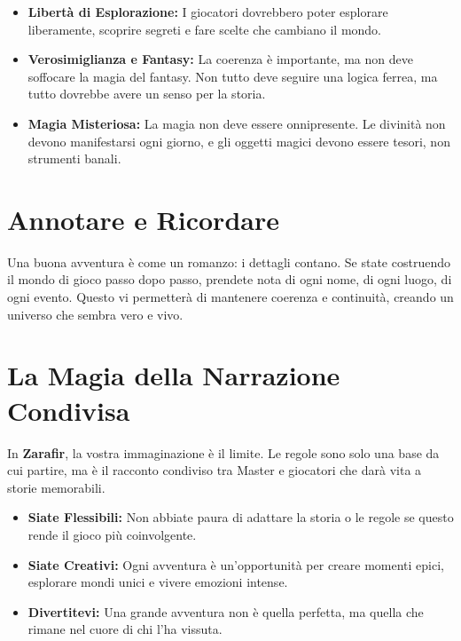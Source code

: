 \documentclass[../manuale_main.tex]{subfiles}
\begin{document}
\begin{itemize}
    \item \textbf{Libertà di Esplorazione:} I giocatori dovrebbero poter esplorare liberamente, scoprire segreti e fare scelte che cambiano il mondo.
    
    \item \textbf{Verosimiglianza e Fantasy:} La coerenza è importante, ma non deve soffocare la magia del fantasy. Non tutto deve seguire una logica ferrea, ma tutto dovrebbe avere un senso per la storia.
    
    \item \textbf{Magia Misteriosa:} La magia non deve essere onnipresente. Le divinità non devono manifestarsi ogni giorno, e gli oggetti magici devono essere tesori, non strumenti banali.
\end{itemize}

\vspace{0.3cm}

\section{Annotare e Ricordare}
Una buona avventura è come un romanzo: i dettagli contano. Se state costruendo il mondo di gioco passo dopo passo, prendete nota di ogni nome, di ogni luogo, di ogni evento. Questo vi permetterà di mantenere coerenza e continuità, creando un universo che sembra vero e vivo.

\vspace{0.3cm}

\section{La Magia della Narrazione Condivisa}
In \textbf{Zarafir}, la vostra immaginazione è il limite. Le regole sono solo una base da cui partire, ma è il racconto condiviso tra Master e giocatori che darà vita a storie memorabili. 

\begin{itemize}
    \item \textbf{Siate Flessibili:} Non abbiate paura di adattare la storia o le regole se questo rende il gioco più coinvolgente.
    
    \item \textbf{Siate Creativi:} Ogni avventura è un’opportunità per creare momenti epici, esplorare mondi unici e vivere emozioni intense.
    
    \item \textbf{Divertitevi:} Una grande avventura non è quella perfetta, ma quella che rimane nel cuore di chi l’ha vissuta.
\end{itemize}
\end{document}
